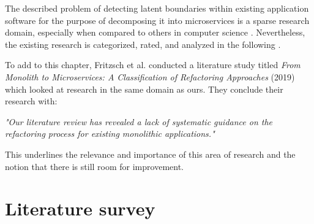 \documentclass[12pt,a4paper]{report}
\begin{document}
The described problem of detecting latent boundaries within existing
application software for the purpose of decomposing it into microservices is a
sparse research domain, especially when compared to others in computer science
\cite{fritzsch2018monolith}. Nevertheless, the existing research is
categorized, rated, and analyzed in the following
\textit{}.

To add to this chapter, Fritzsch et al. conducted a literature study titled
\textit{From Monolith to Microservices: A Classification of Refactoring
Approaches} (2019) \cite{fritzsch2018monolith} which looked at research in the
same domain as ours. They conclude their research with:
\begin{displayquote}
  \emph{
  "Our literature review has revealed a lack of systematic guidance on the
  refactoring process for existing monolithic applications."
  }~\cite{fritzsch2018monolith}
\end{displayquote}
This underlines the relevance and importance of this area of research
and the notion that there is still room for improvement.
\newpage



\section{Literature survey} \label{subsect:literature-survey}
\end{document}
